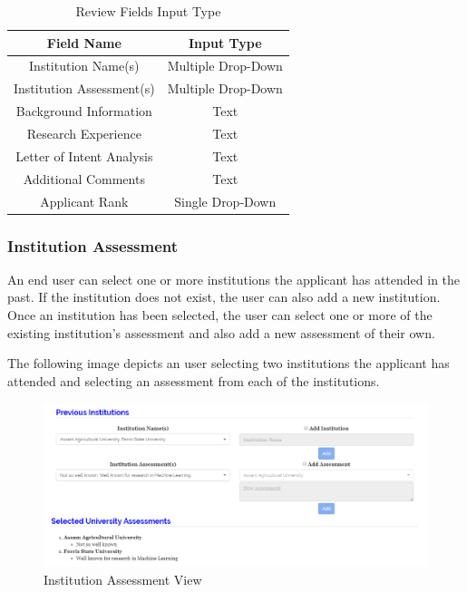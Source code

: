 \documentclass[fontsize=12pt,paper=letter,twoside]{scrartcl}
\begin{document}
\begin{table}[h]
\centering
\begin{tabular}{|c | c |}
	\cline{1-2}
	\textbf{Field Name} & \textbf{Input Type}\\ \hline
	Institution Name(s) & Multiple Drop-Down \\ \hline
	Institution Assessment(s) & Multiple Drop-Down \\ \hline
	Background Information & Text \\ \hline
	Research Experience & Text \\ \hline
	Letter of Intent Analysis & Text \\ \hline
	Additional Comments & Text \\ \hline
	Applicant Rank & Single Drop-Down \\ \hline
\end{tabular}
\caption {Review Fields Input Type}
\label{tbl:review_fields_input}
\end{table}

\subsubsection{Institution Assessment}
An end user can select one or more institutions the applicant has attended in the past. If the institution does not exist, the user can also add a new institution. Once an institution has been selected, the user can select one or more of the existing institution's assessment and also add a new assessment of their own.

\bigskip
\noindent The following image depicts an user selecting two institutions the applicant has attended and selecting an assessment from each of the institutions.

\begin{figure}[!htb]
\begin{center}
\includegraphics[width=.7\textwidth]{images/uni_assessment.png}
\end{center}
\caption{Institution Assessment View}
\label{fig:uni_assessment}
\end{figure}
\end{document}
